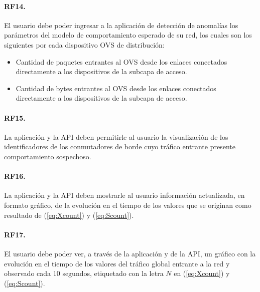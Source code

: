 \paragraph{RF14.} El usuario debe poder ingresar a la aplicación de detección de
anomalías los parámetros del modelo de comportamiento esperado de su red, los
cuales son los siguientes por cada dispositivo OVS de distribución:

\begin{itemize}
\item{Cantidad de paquetes entrantes al OVS desde los enlaces conectados
    directamente a los dispositivos de la subcapa de acceso.}
\item{Cantidad de bytes entrantes al OVS desde los enlaces conectados
    directamente a los dispositivos de la subcapa de acceso.}
\end{itemize}

\paragraph{RF15.} La aplicación y la API deben permitirle al usuario la
visualización de los identificadores de los conmutadores de borde cuyo tráfico
entrante presente comportamiento sospechoso.
\paragraph{RF16.} La aplicación y la API deben mostrarle al usuario información actualizada, en formato gráfico, de la evolución en el tiempo de los
valores que se originan como resultado de (\ref{eq:Xcount}) y (\ref{eq:Scount}).
\paragraph{RF17.} El usuario debe poder ver, a través de la aplicación y de la
API, un gráfico con la evolución en el tiempo de los valores del tráfico global entrante a la red y observado cada 10 segundos, etiquetado con la letra \textbf{\(N\)} en
(\ref{eq:Xcount}) y (\ref{eq:Scount}).
